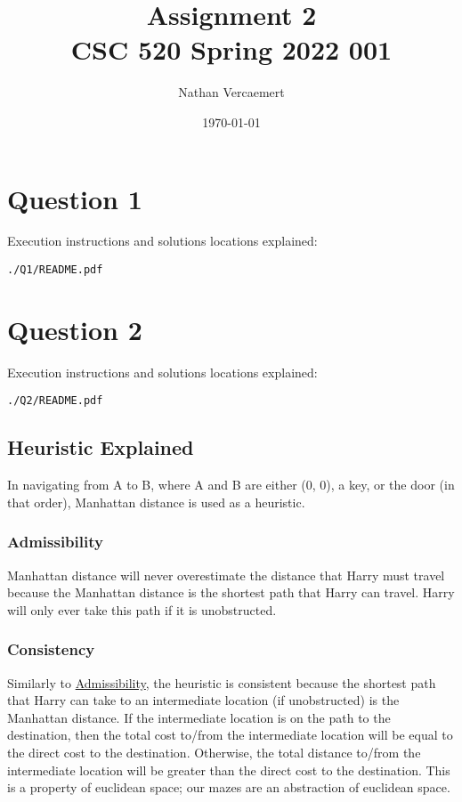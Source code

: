 \documentclass[11pt]{article}
\author{Nathan Vercaemert}
\date{\today}
\title{Assignment 2\\\medskip
\large CSC 520 Spring 2022 001}
\begin{document}
\maketitle
\tableofcontents

\section{Question 1}
\label{sec:orga849f17}
Execution instructions and solutions locations explained:
\lstset{language=shell,label= ,caption= ,captionpos=b,numbers=none}
\begin{lstlisting}
./Q1/README.pdf
\end{lstlisting}
\section{Question 2}
\label{sec:org363f8db}
Execution instructions and solutions locations explained:
\lstset{language=shell,label= ,caption= ,captionpos=b,numbers=none}
\begin{lstlisting}
./Q2/README.pdf
\end{lstlisting}
\subsection{Heuristic Explained}
\label{sec:org4b7c648}
In navigating from A to B, where A and B are either (0, 0), a key, or the door (in that order), Manhattan distance is used as a heuristic.
\subsubsection{Admissibility}
\label{sec:org88208e4}
Manhattan distance will never overestimate the distance that Harry must travel because the Manhattan distance is the shortest path that Harry can travel. Harry will only ever take this path if it is unobstructed.
\subsubsection{Consistency}
\label{sec:orgaa3d97b}
Similarly to \hyperref[sec:org88208e4]{Admissibility}, the heuristic is consistent because the shortest path that Harry can take to an intermediate location (if unobstructed) is the Manhattan distance. If the intermediate location is on the path to the destination, then the total cost to/from the intermediate location will be equal to the direct cost to the destination. Otherwise, the total distance to/from the intermediate location will be greater than the direct cost to the destination. This is a property of euclidean space; our mazes are an abstraction of euclidean space.
\end{document}
